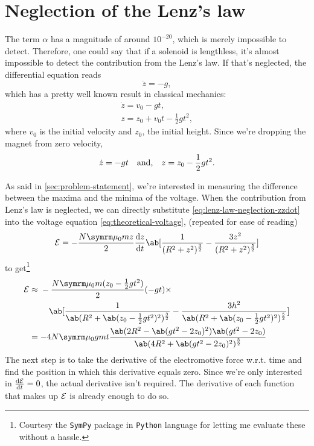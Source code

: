 \section{Neglection of the Lenz's law}

The term $\alpha$ has a magnitude of around $10^{-20}$, which is merely impossible to detect. Therefore, one could say that if a solenoid is lengthless, it's almost impossible to detect the contribution from the Lenz's law. If that's neglected, the differential equation reads
\begin{equation}
	\ddot{z} = -g,
\end{equation}
which has a pretty well known result in classical mechanics:
\begin{gather}
	\dot{z} = v_0 - gt, \\
	z = z_0 + v_0t - \frac{1}{2}gt^2,
\end{gather}
where $v_0$ is the initial velocity and $z_0$, the initial height. Since we're dropping the magnet from zero velocity,
\begin{equation}
	\dot{z} = -gt \quad\textrm{and,}\quad z = z_0 - \frac{1}{2}gt^2. \label{eq:lenz-law-neglection-zzdot}
\end{equation}

As said in \cref{sec:problem-statement}, we're interested in measuring the difference between the maxima and the minima of the voltage. When the contribution from Lenz's law is neglected, we can directly substitute \cref{eq:lenz-law-neglection-zzdot} into the voltage equation \cref{eq:theoretical-voltage}, (repeated for ease of reading)
\begin{equation*}
	\emf = -\frac{N\bperm mz}{2}\odv{z}{t}\ab[\frac{1}{(R^2 + z^2)^{\frac{3}{2}}} - \frac{3z^2}{(R^2 + z^2)^{\frac{5}{2}}}]
\end{equation*}
to get\footnote{Courtesy the \texttt{SymPy} package in \texttt{Python} language for letting me evaluate these without a hassle.}
\begin{align}
	\emf &\approx \begin{multlined}[t]
		 -\frac{N\bperm m(z_0 - \frac{1}{2}gt^2)}{2}(-gt) \times \\ 
		\ab[\frac{1}{\ab(R^2 + \ab(z_0 - \frac{1}{2}gt^2)^2)^{\frac{3}{2}}} - \frac{3h^2}{\ab(R^2 + \ab(z_0 - \frac{1}{2}gt^2)^2)^{\frac{5}{2}}}]
	\end{multlined} \\
		 &= -4N\bperm gmt \frac{\ab(2R^2 - \ab(gt^2 - 2z_0)^2)\ab(gt^2 - 2z_0)}{\ab(4R^2 + \ab(gt^2 - 2z_0)^2)^{\frac{5}{2}}}
\end{align}
The next step is to take the derivative of the electromotive force w.r.t. time and find the position in which this derivative equals zero. Since we're only interested in $\odv{\emf}{t} = 0$, the actual derivative isn't required. The derivative of each function that makes up $\mathcal{E}$ is already enough to do so.

